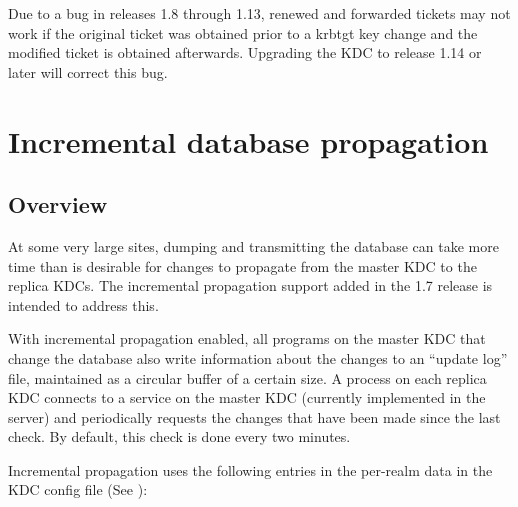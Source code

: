 \documentclass[letterpaper,10pt,english]{sphinxmanual}
\begin{document}
Due to a bug in releases 1.8 through 1.13, renewed and forwarded
tickets may not work if the original ticket was obtained prior to a
krbtgt key change and the modified ticket is obtained afterwards.
Upgrading the KDC to release 1.14 or later will correct this bug.


\section{Incremental database propagation}
\label{\detokenize{admin/database:incremental-database-propagation}}\label{\detokenize{admin/database:incr-db-prop}}

\subsection{Overview}
\label{\detokenize{admin/database:overview}}
At some very large sites, dumping and transmitting the database can
take more time than is desirable for changes to propagate from the
master KDC to the replica KDCs.  The incremental propagation support
added in the 1.7 release is intended to address this.

With incremental propagation enabled, all programs on the master KDC
that change the database also write information about the changes to
an “update log” file, maintained as a circular buffer of a certain
size.  A process on each replica KDC connects to a service on the
master KDC (currently implemented in the {\hyperref[\detokenize{admin/admin_commands/kadmind:kadmind-8}]{}} server) and
periodically requests the changes that have been made since the last
check.  By default, this check is done every two minutes.

Incremental propagation uses the following entries in the per-realm
data in the KDC config file (See {\hyperref[\detokenize{admin/conf_files/kdc_conf:kdc-conf-5}]{}}):
\end{document}
